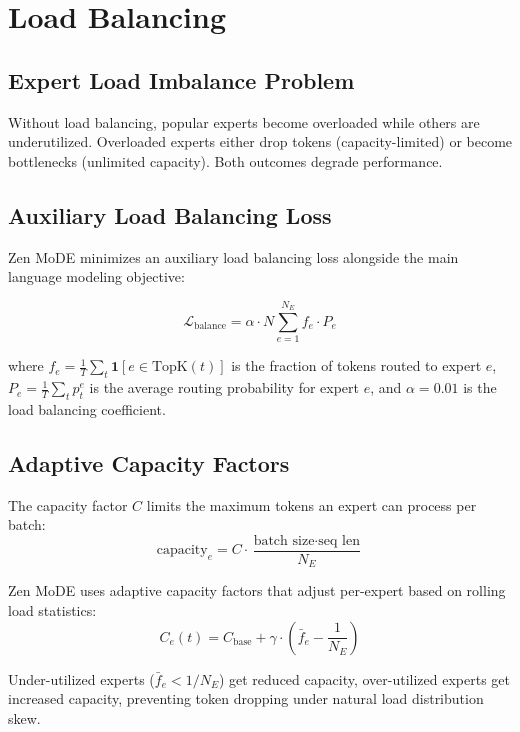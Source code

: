 \documentclass[11pt,a4paper]{article}
\begin{document}
\section{Load Balancing}

\subsection{Expert Load Imbalance Problem}

Without load balancing, popular experts become overloaded while others are underutilized. Overloaded experts either drop tokens (capacity-limited) or become bottlenecks (unlimited capacity). Both outcomes degrade performance.

\subsection{Auxiliary Load Balancing Loss}

Zen MoDE minimizes an auxiliary load balancing loss alongside the main language modeling objective:

\begin{equation}
\mathcal{L}_{\text{balance}} = \alpha \cdot N \sum_{e=1}^{N_E} f_e \cdot P_e
\end{equation}

where $f_e = \frac{1}{T} \sum_t \mathbf{1}[e \in \text{TopK}(t)]$ is the fraction of tokens routed to expert $e$, $P_e = \frac{1}{T} \sum_t p_t^e$ is the average routing probability for expert $e$, and $\alpha = 0.01$ is the load balancing coefficient.

\subsection{Adaptive Capacity Factors}

The capacity factor $C$ limits the maximum tokens an expert can process per batch:
\begin{equation}
\text{capacity}_e = C \cdot \frac{\text{batch size} \cdot \text{seq len}}{N_E}
\end{equation}

Zen MoDE uses adaptive capacity factors that adjust per-expert based on rolling load statistics:
\begin{equation}
C_e(t) = C_{\text{base}} + \gamma \cdot \left(\bar{f}_e - \frac{1}{N_E}\right)
\end{equation}

Under-utilized experts ($\bar{f}_e < 1/N_E$) get reduced capacity, over-utilized experts get increased capacity, preventing token dropping under natural load distribution skew.
\end{document}

